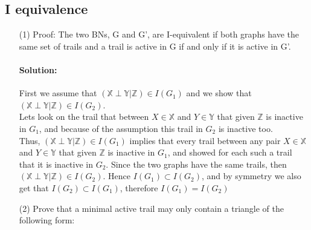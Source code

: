 \documentclass[twoside]{article}
\begin{document}
\subsection{I equivalence}
\begin{itemize}
\item[(1)] Proof: The two BNs, G and G', are I-equivalent if both graphs have the same set of trails and a trail is active in G if and only if it is active in G'.
\paragraph{Solution:}First we assume that $(\mathbb{X} \perp \mathbb{Y}|\mathbb{Z})\in I(G_1)$ and we show that $(\mathbb{X} \perp \mathbb{Y}|\mathbb{Z})\in I(G_2)$.\\

Lets look on the trail that between $X\in \mathbb{X}$ and $Y\in \mathbb{Y}$ that given $\mathbb{Z}$ is inactive in $G_1$, and because of the assumption this trail in $G_2$ is inactive too.  \\

Thus, $(\mathbb{X} \perp \mathbb{Y}|\mathbb{Z})\in I(G_1)$ implies that every trail between any pair $X\in \mathbb{X}$ and $Y\in \mathbb{Y}$ that given $\mathbb{Z}$ is inactive in $G_1$, and showed for each such a trail that it is inactive in $G_2$. Since the two graphs have the same trails, then $(\mathbb{X} \perp \mathbb{Y}|\mathbb{Z})\in I(G_2)$. Hence $I(G_1)\subset I(G_2)$, and by symmetry we also get that $I(G_2)\subset I(G_1)$, therefore $I(G_1) = I(G_2)$


\item[(2)] Prove that a minimal active trail may only contain a triangle of the following form:

\end{itemize}
\end{document}
